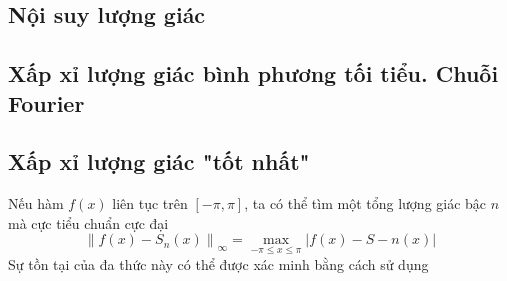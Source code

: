 \subsection{Nội suy lượng giác}

\subsection{Xấp xỉ lượng giác bình phương tối tiểu. Chuỗi Fourier}

\subsection{Xấp xỉ lượng giác "tốt nhất"}

Nếu hàm $f(x)$ liên tục trên $[-\pi, \pi]$, ta có thể tìm một tổng lượng giác bậc $n$ mà cực tiểu chuẩn cực đại
\begin{equation}
    \left \| f(x) - S_n(x) \right \|_{\infty}  = \underset{-\pi\leq x\leq \pi}{\max}\left | f(x) - S-n(x) \right |
\end{equation}
Sự tồn tại của đa thức này có thể được xác minh bằng cách sử dụng 


